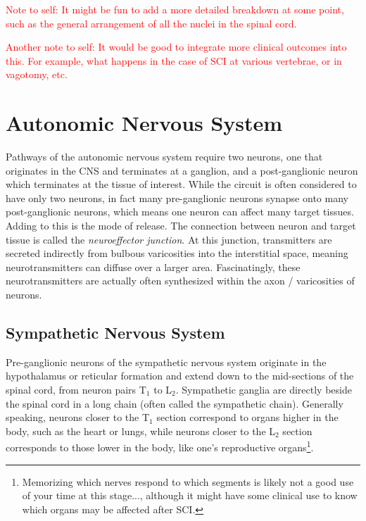 \documentclass[12pt]{report}
\begin{document}
\textcolor{red}{Note to self: It might be fun to add a more detailed breakdown at some point, such as the general arrangement of all the nuclei in the spinal cord.}\newline

\textcolor{red}{Another note to self: It would be good to integrate more clinical outcomes into this. For example, what happens in the case of SCI at various vertebrae, or in vagotomy, etc.}

\section{Autonomic Nervous System}

\label{sec:Autonomic}

Pathways of the autonomic nervous system require two neurons, one that originates in the CNS and terminates at a ganglion, and a post-ganglionic neuron which terminates at the tissue of interest. While the circuit is often considered to have only two neurons, in fact many pre-ganglionic neurons synapse onto many post-ganglionic neurons, which means one neuron can affect many target tissues. Adding to this is the mode of release. The connection between neuron and target tissue is called the \textit{neuroeffector junction}. At this junction, transmitters are secreted indirectly from bulbous varicosities into the interstitial space, meaning neurotransmitters can diffuse over a larger area. Fascinatingly, these neurotransmitters are actually often synthesized within the axon / varicosities of neurons. 

\subsection{Sympathetic Nervous System}
Pre-ganglionic neurons of the sympathetic nervous system originate in the hypothalamus or reticular formation and extend down to the mid-sections of the spinal cord, from neuron pairs T$_1$ to L$_2$. Sympathetic ganglia are directly beside the spinal cord in a long chain (often called the sympathetic chain). Generally speaking, neurons closer to the T$_1$ section correspond to organs higher in the body, such as the heart or lungs, while neurons closer to the L$_2$ section corresponds to those lower in the body, like one's reproductive organs\footnote{Memorizing which nerves respond to which segments is likely not a good use of your time at this stage..., although it might have some clinical use to know which organs may be affected after SCI.}.\newline
\end{document}
